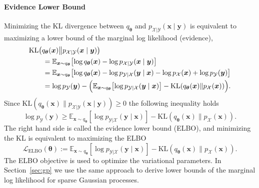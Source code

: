 \paragraph{Evidence Lower Bound} 
Minimizing the  KL divergence between $q_{\boldsymbol{\theta}}$ and $p_{\mathcal{X}|\mathcal{Y}}(\boldsymbol{x}\mid\boldsymbol{y})$ is equivalent to maximizing a lower bound of the marginal log likelihood (evidence),
\begin{align*}
\MoveEqLeft
\mathrm{KL}\!\left(
q_{\boldsymbol{\theta}}(\boldsymbol{x})
\middle\|
p_{\mathcal{X}|\mathcal{Y}}(\boldsymbol{x}\mid\boldsymbol{y})
\right)
\\
&=
\mathbb{E}_{\boldsymbol{x}\sim q_{\boldsymbol{\theta}}}\!\left[
\log q_{\boldsymbol{\theta}}(\boldsymbol{x})
-\log p_{\mathcal{X}|\mathcal{Y}}(\boldsymbol{x}\mid\boldsymbol{y})
\right]
\\
&=
\mathbb{E}_{\boldsymbol{x}\sim q_{\boldsymbol{\theta}}}\!\left[
\log q_{\boldsymbol{\theta}}(\boldsymbol{x})
-\log p_{\mathcal{Y}|\mathcal{X}}(\boldsymbol{y}\mid\boldsymbol{x})
-\log p_{\mathcal{X}}(\boldsymbol{x})
+\log p_{\mathcal{Y}}(\boldsymbol{y})
\right]
\\
&=
\log p_{\mathcal{Y}}(\boldsymbol{y})
-
\Bigl(
\mathbb{E}_{\boldsymbol{x}\sim q_{\boldsymbol{\theta}}}\!\left[
\log p_{\mathcal{Y}|\mathcal{X}}(\boldsymbol{y}\mid\boldsymbol{x})
\right]
-
\mathrm{KL}\!\left(
q_{\boldsymbol{\theta}}(\boldsymbol{x})
\middle\|
p_{\mathcal{X}}(\boldsymbol{x})
\right)
\Bigr).
\end{align*}
Since $\mathrm{KL}\!\left(q_{\boldsymbol{\theta}}(\boldsymbol{x})\|p_{\mathcal{X}|\mathcal{Y}}(\boldsymbol{x}\mid\boldsymbol{y})\right) \geq 0$ the following inequality holds
\begin{equation*}
    \log p_{\mathcal{Y}}(\boldsymbol{y}) \geq \mathbb{E}_{\boldsymbol{x}\sim q_{\boldsymbol{\theta}}}\!\left[\log p_{\mathcal{Y}|\mathcal{X}}(\boldsymbol{y}\mid\boldsymbol{x})\right]
    -
    \mathrm{KL}\!\left(q_{\boldsymbol{\theta}}(\boldsymbol{x})\|p_{\mathcal{X}}(\boldsymbol{x})\right).
\end{equation*}
    The right hand side is called the evidence lower bound (ELBO), and minimizing the KL is equivalent to maximizing the ELBO 
\begin{equation}
    \mathcal{L}_{\mathrm{ELBO}}(\boldsymbol{\theta})
    :=
    \mathbb{E}_{\boldsymbol{x}\sim q_{\boldsymbol{\theta}}}\!\left[\log p_{\mathcal{Y}|\mathcal{X}}(\boldsymbol{y}\mid\boldsymbol{x})\right]
    -
    \mathrm{KL}\!\left(q_{\boldsymbol{\theta}}(\boldsymbol{x})\|p_{\mathcal{X}}(\boldsymbol{x})\right).
    \label{eq:elbo}
\end{equation}
The ELBO objective is used to optimize the variational  parameters. 
In Section~\ref{sec:gp} we use the same approach to derive lower bounds of the marginal log likelihood for sparse Gaussian processes.


